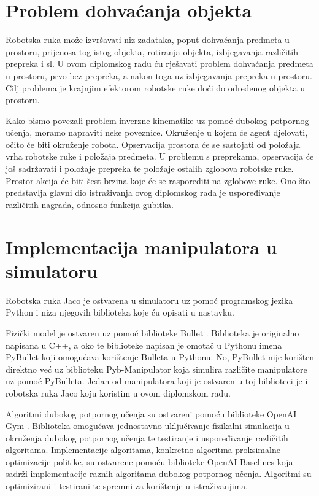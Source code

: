 \documentclass[times,utf8,diplomski]{fer}
\begin{document}
\section{Problem dohvaćanja objekta}

Robotska ruka može izvršavati niz zadataka, poput dohvaćanja predmeta u prostoru, prijenosa tog istog objekta, rotiranja objekta, izbjegavanja različitih prepreka i sl. U ovom diplomskog radu ću rješavati problem dohvaćanja predmeta u prostoru, prvo bez prepreka, a nakon toga uz izbjegavanja prepreka u prostoru. Cilj problema je krajnjim efektorom robotske ruke doći do određenog objekta u prostoru.

Kako bismo povezali problem inverzne kinematike uz pomoć dubokog potpornog učenja, moramo napraviti neke poveznice. Okruženje u kojem će agent djelovati, očito će biti okruženje robota. Opservacija prostora će se sastojati od položaja vrha robotske ruke i položaja predmeta. U problemu s preprekama, opservacija će još sadržavati i položaje prepreka te položaje ostalih zglobova robotske ruke. Prostor akcija će biti šest brzina koje će se rasporediti na zglobove ruke. Ono što predstavlja glavni dio istraživanja ovog diplomskog rada je uspoređivanje različitih nagrada, odnosno funkcija gubitka. 

\section{Implementacija manipulatora u simulatoru}

Robotska ruka Jaco je ostvarena u simulatoru uz pomoć programskog jezika Python i niza njegovih biblioteka koje ću opisati u nastavku.

Fizički model je ostvaren uz pomoć biblioteke Bullet \citep{bullet}. Biblioteka je originalno napisana u C++, a oko te biblioteke napisan je omotač u Pythonu imena PyBullet koji omogućava korištenje Bulleta u Pythonu. No, PyBullet nije korišten direktno već uz biblioteku Pyb-Manipulator koja simulira različite manipulatore uz pomoć PyBulleta. Jedan od manipulatora koji je ostvaren u toj biblioteci je i robotska ruka Jaco koju koristim u ovom diplomskom radu.

Algoritmi dubokog potpornog učenja su ostvareni pomoću biblioteke OpenAI Gym \citep{gym}. Biblioteka omogućava jednostavno uključivanje fizikalni simulacija u okruženja dubokog potpornog učenja te testiranje i uspoređivanje različitih algoritama. Implementacije algoritama, konkretno algoritma proksimalne optimizacije politike, su ostvarene pomoću biblioteke OpenAI Baselines \citep{baselines} koja sadrži implementacije raznih algoritama dubokog potpornog učenja. Algoritmi su optimizirani i testirani te spremni za korištenje u istraživanjima.
\end{document}
